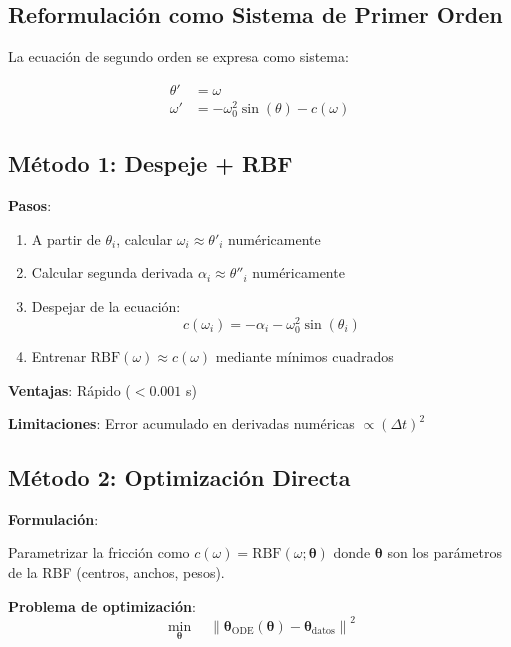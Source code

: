 \documentclass[11pt,a4paper]{article}
\begin{document}
\subsection{Reformulación como Sistema de Primer Orden}

La ecuación de segundo orden se expresa como sistema:

\begin{align}
\theta' &= \omega \\
\omega' &= -\omega_0^2 \sin(\theta) - c(\omega)
\end{align}

\subsection{Método 1: Despeje + RBF}

\textbf{Pasos}:
\begin{enumerate}
\item A partir de $\theta_i$, calcular $\omega_i \approx \theta'_i$ numéricamente
\item Calcular segunda derivada $\alpha_i \approx \theta''_i$ numéricamente
\item Despejar de la ecuación:
\begin{equation}
c(\omega_i) = -\alpha_i - \omega_0^2 \sin(\theta_i)
\end{equation}
\item Entrenar $\text{RBF}(\omega) \approx c(\omega)$ mediante mínimos cuadrados
\end{enumerate}

\textbf{Ventajas}: Rápido ($< 0.001$ s)

\textbf{Limitaciones}: Error acumulado en derivadas numéricas $\propto (\Delta t)^2$

\subsection{Método 2: Optimización Directa}

\textbf{Formulación}:

Parametrizar la fricción como $c(\omega) = \text{RBF}(\omega; \boldsymbol{\theta})$ donde $\boldsymbol{\theta}$ son los parámetros de la RBF (centros, anchos, pesos).

\textbf{Problema de optimización}:
\begin{equation}
\min_{\boldsymbol{\theta}} \quad \left\| \boldsymbol{\theta}_{\text{ODE}}(\boldsymbol{\theta}) - \boldsymbol{\theta}_{\text{datos}} \right\|^2
\end{equation}
\end{document}
